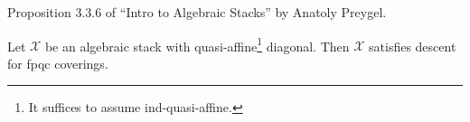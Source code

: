 %
\begin{proposition}
\label{proposition-stack-fpqc}
\begin{reference}
Proposition 3.3.6 of ``Intro to Algebraic Stacks'' by
Anatoly Preygel.
\end{reference}
Let $\mathcal{X}$ be an algebraic stack with quasi-affine\footnote{It suffices
to assume ind-quasi-affine.} diagonal. Then
$\mathcal{X}$ satisfies descent for fpqc coverings.
\end{proposition}

